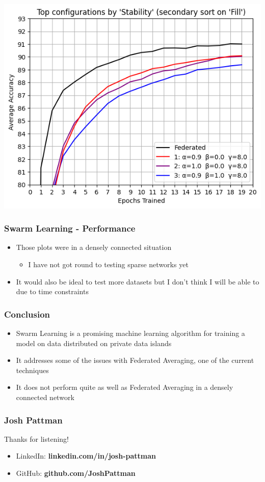 \documentclass{beamer}
\begin{document}
	\begin{frame}
		\includegraphics[width = \textwidth]{stability_zoom}
	\end{frame}

	\begin{frame}
		\frametitle{Swarm Learning - Performance}
		\begin{itemize}
			\item Those plots were in a densely connected situation
			\begin{itemize}
				\item I have not got round to testing sparse networks yet
			\end{itemize}
		\item It would also be ideal to test more datasets but I don't think I will be able to due to time constraints
		\end{itemize}
	\end{frame}

	\begin{frame}
		\frametitle{Conclusion}
		\begin{itemize}
			\item Swarm Learning is a promising machine learning algorithm for training a model on data distributed on private data islands
			\item It addresses some of the issues with Federated Averaging, one of the current techniques
			\item It does not perform quite as well as Federated Averaging in a densely connected network
		\end{itemize}
	\end{frame}

	\begin{frame}
		\frametitle{Josh Pattman}
		Thanks for listening!
		\begin{itemize}
			\item LinkedIn: \textbf{linkedin.com/in/josh-pattman}
			\item GitHub: \textbf{github.com/JoshPattman}
		\end{itemize}
	\end{frame}
	
\end{document}
